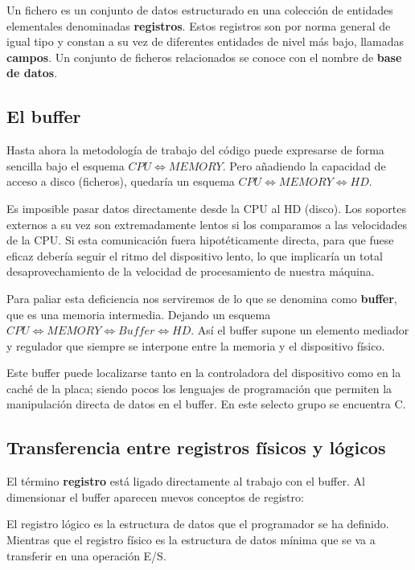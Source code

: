 \documentclass[a4paper, 11pt, titlepage]{article}
\begin{document}
    Un fichero es un conjunto de datos estructurado en una colección de entidades elementales denominadas 
    \textbf{registros}. Estos registros son por norma general de igual tipo y constan a su vez de diferentes entidades 
    de nivel más bajo, llamadas \textbf{campos}. Un conjunto de ficheros relacionados se conoce con el nombre 
    de \textbf{base de datos}.

    \subsection{El buffer}

        Hasta ahora la metodología de trabajo del código puede expresarse de forma sencilla bajo el 
        esquema $CPU\iff MEMORY$. Pero añadiendo la capacidad de acceso a disco (ficheros), quedaría 
        un esquema $CPU\iff MEMORY\iff HD$.

        Es imposible pasar datos directamente desde la CPU al HD (disco). Los soportes externos a su vez 
        son extremadamente lentos si los comparamos a las velocidades de la CPU. Si esta comunicación 
        fuera hipotéticamente directa, para que fuese eficaz debería seguir el ritmo del dispositivo lento,
        lo que implicaría un total desaprovechamiento de la velocidad de procesamiento de nuestra máquina.

        Para paliar esta deficiencia nos serviremos de lo que se denomina como \textbf{buffer}, que es 
        una memoria intermedia. Dejando un esquema $CPU\iff MEMORY\iff Buffer\iff HD$. Así el buffer 
        supone un elemento mediador y regulador que siempre se interpone entre la memoria y el dispositivo 
        físico.

        Este buffer puede localizarse tanto en la controladora del dispositivo como en la caché de la placa; 
        siendo pocos los lenguajes de programación que permiten la manipulación directa de datos en el 
        buffer. En este selecto grupo se encuentra C.

    \subsection{Transferencia entre registros físicos y lógicos}

        El término \textbf{registro} está ligado directamente al trabajo con el buffer. Al dimensionar 
        el buffer aparecen nuevos conceptos de registro:

        El registro lógico es la estructura de datos que el programador se ha definido. Mientras que 
        el registro físico es la estructura de datos mínima que se va a transferir en una 
        operación E/S.
\end{document}
